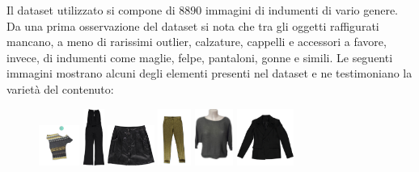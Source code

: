 \documentclass[]{report}
\begin{document}
	Il dataset utilizzato si compone di $8890$ immagini di indumenti di vario genere. Da una prima osservazione del dataset si nota che tra gli oggetti raffigurati mancano, a meno di rarissimi outlier, calzature, cappelli e accessori a favore, invece, di indumenti come maglie, felpe, pantaloni, gonne e simili. Le seguenti immagini mostrano alcuni degli elementi presenti nel dataset e ne testimoniano la varietà del contenuto:
	\begin{figure}[ht!]
		\includegraphics[width=.15\textwidth,height=50px]{./img/a}\hfill
		\includegraphics[width=.11\textwidth,height=70px]{./img/b}\hfill
		\includegraphics[width=.15\textwidth,height=50px]{./img/c}\hfill
		\includegraphics[width=.11\textwidth,height=70px]{./img/d}\hfill
		\includegraphics[width=.13\textwidth,height=70px]{./img/e}\hfill
		\includegraphics[width=.15\textwidth,height=70px]{./img/f}
	\end{figure}
\end{document}
